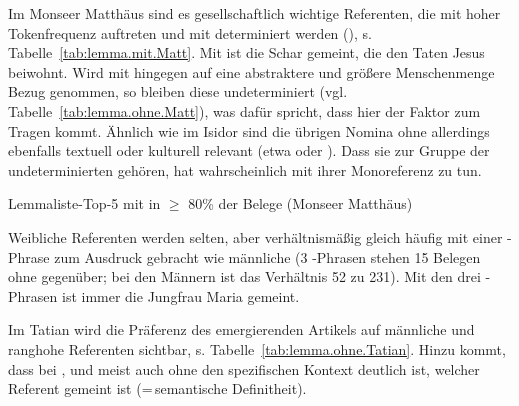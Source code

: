 

Im Monseer Matthäus sind es gesellschaftlich wichtige Referenten, die mit hoher Tokenfrequenz auftreten und mit  determiniert werden (), s. Tabelle~\ref{tab:lemma.mit.Matt}. Mit  ist die Schar gemeint, die den Taten Jesus beiwohnt. Wird mit  hingegen auf eine abstraktere und größere Menschenmenge Bezug genommen, so bleiben diese undeterminiert (vgl. Tabelle~\ref{tab:lemma.ohne.Matt}), was dafür spricht, dass hier der Faktor  zum Tragen kommt. Ähnlich wie im Isidor sind die übrigen Nomina ohne  allerdings ebenfalls textuell  oder kulturell  relevant  (etwa  oder ).  Dass sie zur Gruppe der undeterminierten  gehören, hat wahrscheinlich mit ihrer Monoreferenz zu tun. 

  \begin{table}
      \resizebox{\textwidth}{!}{}
      \caption{Lemmaliste-Top-5 mit  in $\geq$ 80\% der Belege (Monseer Matthäus)\label{tab:lemma.mit.Matt}}
  \end{table}

Weibliche Referenten werden selten, aber verhältnismäßig gleich häufig mit einer -Phrase  zum Ausdruck gebracht wie männliche (3 -Phrasen  stehen 15 Belegen ohne  gegenüber; bei den Männern ist das Verhältnis 52 zu 231). Mit den drei -Phrasen  ist immer die Jungfrau Maria gemeint. 


Im Tatian wird die Präferenz des emergierenden Artikels auf männliche und ranghohe Referenten  sichtbar, s. Tabelle~\ref{tab:lemma.ohne.Tatian}. Hinzu kommt, dass bei ,  und  meist auch ohne den spezifischen Kontext deutlich ist, welcher Referent gemeint ist  (=\,semantische Definitheit).

